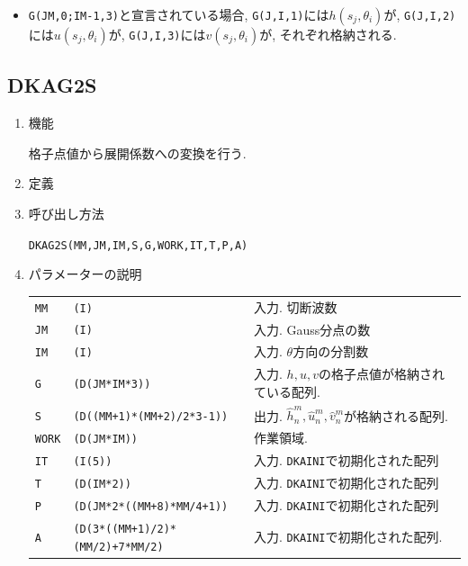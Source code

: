 \documentclass[a4j,fleqn]{jarticle}
\begin{document}
\begin{enumerate}
\begin{itemize}
\item {\tt G(JM,0;IM-1,3)}と宣言されている場合, 
   {\tt G(J,I,1)}には$h(s_j,\theta_i)$が,
   {\tt G(J,I,2)}には$u(s_j,\theta_i)$が,
   {\tt G(J,I,3)}には$v(s_j,\theta_i)$が, それぞれ格納される.

\end{itemize}

\end{enumerate}


\subsection{DKAG2S}

\begin{enumerate}

\item 機能

格子点値から展開係数への変換を行う.

\item 定義

\item 呼び出し方法 
    
{\tt DKAG2S(MM,JM,IM,S,G,WORK,IT,T,P,A)}
  
\item パラメーターの説明 
    
\begin{tabular}{lll}
{\tt MM} & {\tt (I)} & 入力. 切断波数\\
{\tt JM} & {\tt (I)} & 入力. Gauss分点の数\\
{\tt IM} & {\tt (I)} & 入力. $\theta$方向の分割数\\
{\tt G}   & {\tt (D(JM*IM*3))} & 入力. $h,u,v$の格子点値が格納されている配列.\\
{\tt S}   & {\tt (D((MM+1)*(MM+2)/2*3-1))} & 出力. $\hat h^m_n,\hat u^m_n,\hat
v^m_n$が格納される配列.\\
{\tt WORK}   & {\tt (D(JM*IM))} & 作業領域.\\
{\tt IT}  & {\tt (I(5))}    & 入力. {\tt DKAINI}で初期化された配列\\
{\tt T}   & {\tt (D(IM*2))} & 入力. {\tt DKAINI}で初期化された配列\\
{\tt P}  & {\tt (D(JM*2*((MM+8)*MM/4+1))} & 入力. {\tt DKAINI}で初期化された配列\\
{\tt A}  & {\tt (D(3*((MM+1)/2)*(MM/2)+7*MM/2)} & 入力. {\tt DKAINI}で初期化された配列.
\end{tabular}


\end{enumerate}
\end{document}
